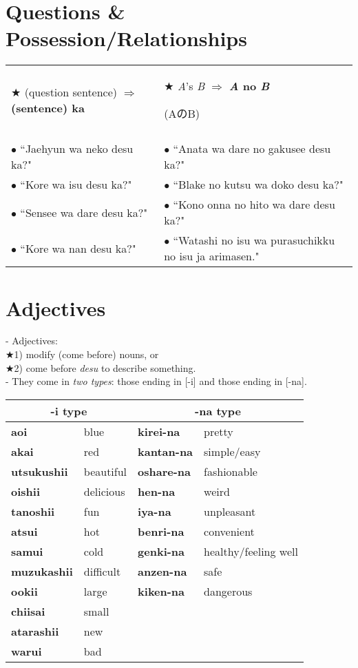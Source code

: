 \documentclass[11pt]{article} %
\newcommand{\ee}{\vspace{.10cm}\\} %
\begin{document}
\section{Questions \& Possession/Relationships}
\begin{tabular}{l || l}
$\bigstar$ (question sentence) $\Rightarrow$ \textbf{(sentence) ka} & $\bigstar$ \textit{A}'s \textit{B} $\Rightarrow$ \textbf{\textit{A} no \textit{B}}
\begin{CJK}{UTF8}{min}(AのB)\end{CJK}\\
&\\
$\bullet$ ``Jaehyun wa neko desu ka?" & $\bullet$ ``Anata wa dare no gakusee desu ka?"\\
$\bullet$ ``Kore wa isu desu ka?" & $\bullet$ ``Blake no kutsu wa doko desu ka?"\\
$\bullet$ ``Sensee wa dare desu ka?" & $\bullet$ ``Kono onna no hito wa dare desu ka?"\\
$\bullet$ ``Kore wa nan desu ka?" & $\bullet$ ``Watashi no isu wa purasuchikku no isu ja arimasen."

\end{tabular}


\section{Adjectives}

- Adjectives:\\
$\bigstar$1) modify (come before) nouns, or \\
$\bigstar$2) come before \textit{desu} to describe something.\ee
- They come in \textit{two types}: those ending in [-i] and those ending in [-na].
\begin{center}
\begin{tabular}{l l | l l}
\multicolumn{2}{c}{-i type}			 & \multicolumn{2}{c}{-na type}\\
\hline
\textbf{aoi} & blue 				& \textbf{kirei-na} & pretty	\\
\textbf{akai} & red 				& \textbf{kantan-na} & simple/easy \\
\textbf{utsukushii} & beautiful 	& \textbf{oshare-na} & fashionable \\
\textbf{oishii} & delicious 		& \textbf{hen-na}	& weird\\
\textbf{tanoshii} & fun 			& \textbf{iya-na}	& unpleasant\\
\textbf{atsui} & hot 				& \textbf{benri-na} & convenient\\
\textbf{samui} & cold 				& \textbf{genki-na} & healthy/feeling well\\
\textbf{muzukashii} & difficult 	& \textbf{anzen-na}	& safe\\
\textbf{ookii} & large 				& \textbf{kiken-na} & dangerous\\
\textbf{chiisai} & small \\
\textbf{atarashii}	& new \\
\textbf{warui} & bad \\
\end{tabular}
\end{center}
\end{document}
